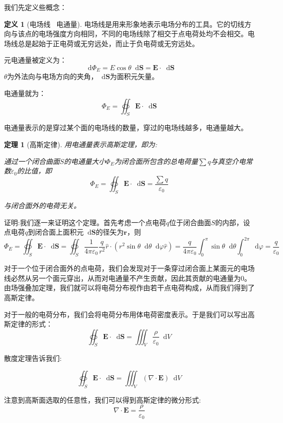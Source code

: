 \documentclass[12pt,a4paper,oneside]{report}
\newtheorem{theorem}{定理}[chapter]
\theoremstyle{definition}
\newtheorem{definition}{定义}[chapter]
\theoremstyle{remark}
\renewcommand{\d}{\mathop{}\!\mathrm{d}}
\begin{document}
我们先定义些概念：
\begin{definition}[电场线 \, 电通量]
  电场线是用来形象地表示电场分布的工具。它的切线方向与该点的电场强度方向相同，不同的电场线除了相交于点电荷处均不会相交。电场线总是起始于正电荷或无穷远处，而止于负电荷或无穷远处。

  元电通量被定义为：
  \[
  \d \Phi_E = E \cos\theta \d \mathbf{S} = \mathbf{E} \cdot \d\mathbf{S}
  \]
$\theta$为外法向与电场方向的夹角，$\d\mathbf{S}$为面积元矢量。

电通量就为：
  \[
  \Phi_E = \oiint_S \mathbf{E} \cdot \d\mathbf{S}
  \]

电通量表示的是穿过某个面的电场线的数量，穿过的电场线越多，电通量越大。
\end{definition}
\begin{theorem}[高斯定律]
用电通量表示高斯定理，即为:

通过一个闭合曲面\textbf{$S$}的电通量大小\textbf{$\Phi_E$}为闭合面所包含的总电荷量$\sum q$与真空介电常数$\varepsilon_0$的比值，即
  \[
  \Phi_E = \oiint_S \mathbf{E} \cdot \d\mathbf{S} = \frac{\sum q}{\varepsilon_0}
  \]

  与闭合面外的电荷无关。
\end{theorem}

证明:我们逐一来证明这个定理。首先考虑一个点电荷$q$位于闭合曲面$S$的内部，设点电荷$q$到闭合面上面积元$\d\mathbf{S}$的径矢为$\mathbf{r}$，则
  \[
  \Phi_E = \oiint_S \mathbf{E} \cdot \d\mathbf{S}= \oiint_S \frac{1}{4\pi\varepsilon_0} \frac{q}{r^2}\hat{r} \cdot (r^2 \sin\theta \d \theta \d \varphi \hat{r}) = \frac{q}{4\pi\varepsilon_0} \int_0^{\pi} \sin\theta \d \theta \int_0^{2\pi} \d \varphi
  = \frac{q}{\varepsilon_0}
  \]

对于一个位于闭合面外的点电荷，我们会发现对于一条穿过闭合面上某面元的电场线必然从另一个面元穿出，从而对电通量不产生贡献，因此其贡献的电通量为0。
由场强叠加定理，我们就可以将电荷分布视作由若干点电荷构成，从而我们得到了高斯定律。

对于一般的电荷分布，我们会将电荷分布用体电荷密度表示。于是我们可以写出高斯定律的形式：
  \[
  \oiint_S \mathbf{E} \cdot \d\mathbf{S} = \iiint_V \frac{\rho}{\varepsilon_0} \d V
  \]

散度定理告诉我们:

\[
\oiint_S \mathbf{E} \cdot \d \mathbf{S} = \iiint_V (\nabla \cdot \mathbf{E}) \d V
\]

注意到高斯面选取的任意性，我们可以得到高斯定律的微分形式:
\[
\nabla \cdot \mathbf{E} = \frac{\rho}{\varepsilon_0}
\]
\end{document}
